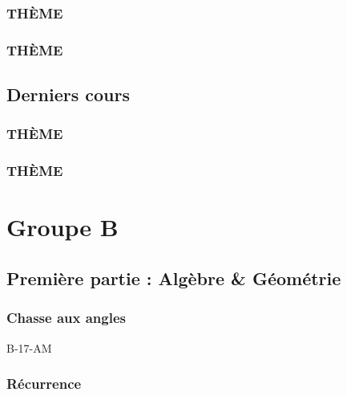 \documentclass[poly,trombi]{valbonne}
\begin{document}

\subsection{THÈME}


\subsection{THÈME}



\section{Derniers cours}

\subsection{THÈME}


\subsection{THÈME}







\chapter{Groupe B}

\minitoc \clearpage

\section{Première partie : Algèbre \& Géométrie}

\subsection{Chasse aux angles}

{B-17-AM}

\subsection{Récurrence}
\end{document}
